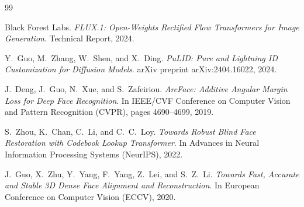 \documentclass[11pt,a4paper]{article}
\begin{document}
\begin{thebibliography}{99}

Black Forest Labs.
\newblock \emph{FLUX.1: Open-Weights Rectified Flow Transformers for Image Generation}.
\newblock Technical Report, 2024.

Y.~Guo, M.~Zhang, W.~Shen, and X.~Ding.
\newblock \emph{PuLID: Pure and Lightning ID Customization for Diffusion Models}.
\newblock arXiv preprint arXiv:2404.16022, 2024.

J.~Deng, J.~Guo, N.~Xue, and S.~Zafeiriou.
\newblock \emph{ArcFace: Additive Angular Margin Loss for Deep Face Recognition}.
\newblock In IEEE/CVF Conference on Computer Vision and Pattern Recognition (CVPR), pages 4690--4699, 2019.

S.~Zhou, K.~Chan, C.~Li, and C.~C.~Loy.
\newblock \emph{Towards Robust Blind Face Restoration with Codebook Lookup Transformer}.
\newblock In Advances in Neural Information Processing Systems (NeurIPS), 2022.

J.~Guo, X.~Zhu, Y.~Yang, F.~Yang, Z.~Lei, and S.~Z.~Li.
\newblock \emph{Towards Fast, Accurate and Stable 3D Dense Face Alignment and Reconstruction}.
\newblock In European Conference on Computer Vision (ECCV), 2020.

\end{thebibliography}
\end{document}
